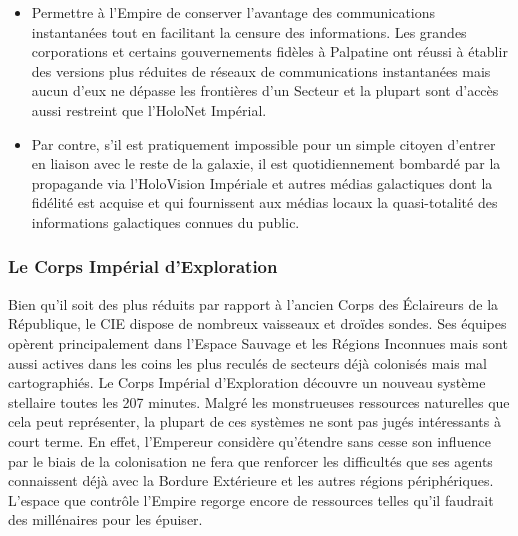 \documentclass[twoside]{article}
\begin{document}
\begin{itemize}
	\item Permettre à l'Empire de conserver l'avantage des communications instantanées tout en facilitant la censure des informations. Les grandes corporations et certains gouvernements fidèles à Palpatine ont réussi à établir des versions plus réduites de réseaux de communications instantanées mais aucun d'eux ne dépasse les frontières d'un Secteur et la plupart sont d'accès aussi restreint que l'HoloNet Impérial.
	\item Par contre, s'il est pratiquement impossible pour un simple citoyen d'entrer en liaison avec le reste de la galaxie, il est quotidiennement bombardé par la propagande via l'HoloVision Impériale et autres médias galactiques dont la fidélité est acquise et qui fournissent aux médias locaux la quasi-totalité des informations galactiques connues du public.
\end{itemize}

\subsubsection{Le Corps Impérial d'Exploration}
Bien qu'il soit des plus réduits par rapport à l'ancien Corps des Éclaireurs de la République, le CIE dispose de nombreux vaisseaux et droïdes sondes. Ses équipes opèrent principalement dans l'Espace Sauvage et les Régions Inconnues mais sont aussi actives dans les coins les plus reculés de secteurs déjà colonisés mais mal cartographiés. Le Corps Impérial d'Exploration découvre un nouveau système stellaire toutes les 207 minutes. Malgré les monstrueuses ressources naturelles que cela peut représenter, la plupart de ces systèmes ne sont pas jugés intéressants à court terme. En effet, l'Empereur considère qu'étendre sans cesse son influence par le biais de la colonisation ne fera que renforcer les difficultés que ses agents connaissent déjà avec la Bordure Extérieure et les autres régions périphériques. L'espace que contrôle l'Empire regorge encore de ressources telles qu'il faudrait des millénaires pour les épuiser. \\
\end{document}
